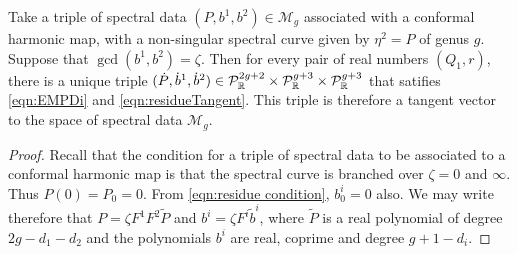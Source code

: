 \begin{lem}[Case (v)]
    \label{lem:tangent conformal}
Take a triple of spectral data $(P,b^1,b^2)\in\mathcal{M}_g$ associated with a conformal harmonic map, with a non-singular spectral curve given by $η^2 = P$ of genus $g$. Suppose that $\gcd(b^1,b^2) = ζ$. Then for every pair of real numbers $(Q_1,r)$, there is a unique triple $(\dot P, \dot b^1, \dot b^2) \in \mathcal{P}_\R^{2g+2}\times\mathcal{P}_\R^{g+3}\times\mathcal{P}_\R^{g+3}$ that satifies \eqref{eqn:EMPDi} and \eqref{eqn:residueTangent}. This triple is therefore a tangent vector to the space of spectral data $\mathcal{M}_g$.

\begin{proof}
Recall that the condition for a triple of spectral data to be associated to a conformal harmonic map is that the spectral curve is branched over $ζ=0$ and $\infty$. Thus $P(0) = P_0 =0$. From \eqref{eqn:residue condition}, $b^i_0 = 0$ also. We may write therefore that $P= ζF^1F^2\tilde{P}$ and $b^i = ζF^i \tilde{b}^i$, where $\tilde{P}$ is a real polynomial of degree $2g - d_1 - d_2$ and the polynomials $b^i$ are real, coprime and degree $g+1-d_i$.


\end{proof}
\end{lem}
